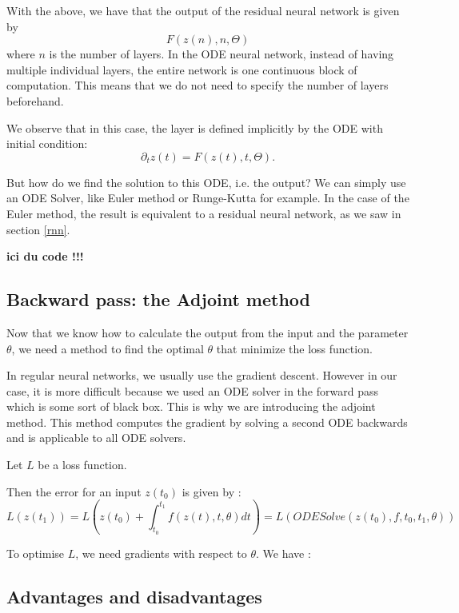 \documentclass[10pt,a4paper]{article}
\theoremstyle{definition}
\theoremstyle{definition}
\begin{document}
With the above, we have that the output of the residual neural network is given by
$$ F(z(n), n, \Theta) $$
where $n$ is the number of layers. 
In the ODE neural network, instead of having multiple individual layers, the entire network is one continuous block of computation. This means that we do not need to specify the number of layers beforehand.

We observe that in this case, the layer is defined implicitly by the ODE with initial condition:
$$ \partial_t z(t) = F(z(t), t, \Theta). $$

But how do we find the solution to this ODE, i.e. the output? We can simply use an ODE Solver, like Euler method or Runge-Kutta for example. In the case of the Euler method, the result is equivalent to a residual neural network, as we saw in section \ref{rnn}.

\textbf{ici du code !!!}


\subsection{Backward pass: the Adjoint method}
Now that we know how to calculate the output from the input and the parameter $\theta$, we need a method to find the optimal $\theta$ that minimize the loss function.

In regular neural networks, we usually use the gradient descent. However in our case, it is more difficult because we used an ODE solver in the forward pass which is some sort of black box. This is why we are introducing the adjoint method. This method computes the gradient by solving a second ODE backwards and is applicable to all ODE solvers.

Let $L$ be a loss function.

Then the error for an input $z(t_0)$ is given by :
$$
L(z(t_1)) = L(z(t_0) + \int_{t_0}^{t_1} f(z(t),t,\theta) dt ) = L(ODESolve(z(t_0),f,t_0,t_1,\theta))
$$

To optimise $L$, we need gradients with respect to $\theta$. We have :
$$
\
$$

\subsection{Advantages and disadvantages}
\end{document}
